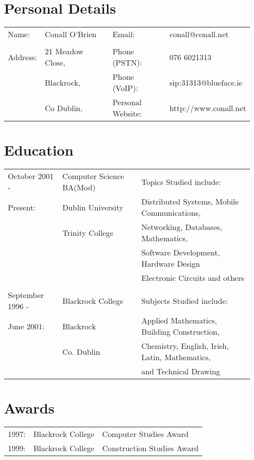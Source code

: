 \documentclass[a4paper, 11pt] {article}
\begin{document}
\section*{Personal Details}

\begin{tabular}{l l l l l}
Name: 	& Conall O'Brien		&	&	Email: 				& conall@conall.net 	  	\\	
			&							&	&							&								\\
Address:	& 21 Meadow Close, 	&	&	Phone (PSTN):		& 076 6021313				\\
			& Blackrock,			&	&	Phone (VoIP):		& sip:31313@blueface.ie	\\
			& Co Dublin, 		 	&  &	Personal Website:	& http://www.conall.net	\\
\end{tabular}

\section*{Education}

\begin{tabular}{l l l l}
October 2001 - 		& Computer Science BA(Mod)	&	&	Topics Studied include:				\\
Present:					& 	Dublin University 		&	&	Distributed Systems, Mobile Communications,\\
							& 	Trinity College 			&	& 	Networking, Databases, Mathematics, \\ 
							&									&	&	Software Development, Hardware Design \\
						 	&									&	&	Electronic Circuits and others	\\	
							&									&	&	\\
September 1996 - 		& Blackrock College			&	&	Subjects Studied include:\\
June 2001:				& Blackrock						&	&	Applied Mathematics, Building Construction, \\ 
							& Co. Dublin 					&	&	Chemistry, English, Irish, Latin, Mathematics, \\
							&									&	&	and Technical Drawing \\
\end{tabular}

\section*{Awards}

\begin{tabular}{l l l}
1997:	& Blackrock College	 & 	Computer Studies Award 		\\
1999:	& Blackrock College 	 & 	Construction Studies Award	\\
\end{tabular}
\end{document}
